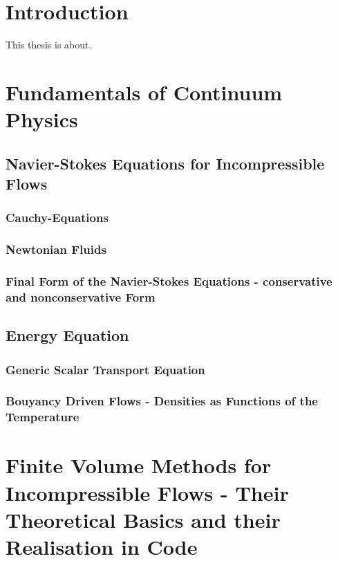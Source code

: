 \documentclass[article,type=msc,colorback,accentcolor=tud2a]{tudthesis}
\begin{document}
  \author{Fabian Gabel}
  \makethesistitle
  \tableofcontents

\printnomenclature
  \section{Introduction}

  This thesis is about. 

  \section{Fundamentals of Continuum Physics}

    \subsection{Navier-Stokes Equations for Incompressible Flows}

      \subsubsection{Cauchy-Equations}
      \subsubsection{Newtonian Fluids}
      \subsubsection{Final Form of the Navier-Stokes Equations - conservative and nonconservative Form}

    \subsection{Energy Equation}

      \subsubsection{Generic Scalar Transport Equation}
      \subsubsection{Bouyancy Driven Flows - Densities as Functions of the Temperature}

  \section{Finite Volume Methods for Incompressible Flows - Their Theoretical Basics and their Realisation in Code}
\end{document}
